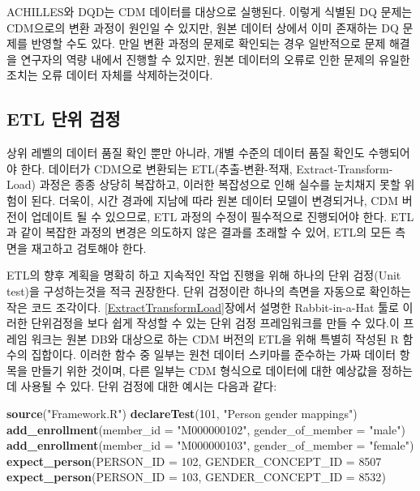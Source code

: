 \documentclass[10.5pt]{book}
\newenvironment{Shaded}{\begin{snugshade}}{\end{snugshade}}
\newcommand{\KeywordTok}[1]{\textcolor[rgb]{0.13,0.29,0.53}{\textbf{#1}}}
\newcommand{\DataTypeTok}[1]{\textcolor[rgb]{0.13,0.29,0.53}{#1}}
\newcommand{\DecValTok}[1]{\textcolor[rgb]{0.00,0.00,0.81}{#1}}
\newcommand{\StringTok}[1]{\textcolor[rgb]{0.31,0.60,0.02}{#1}}
\newcommand{\NormalTok}[1]{#1}
\theoremstyle{definition}
\theoremstyle{definition}
\theoremstyle{definition}
\theoremstyle{remark}
\let\BeginKnitrBlock\begin \let\EndKnitrBlock\end
\begin{document}
\BeginKnitrBlock{rmdimportant}
ACHILLES와 DQD는 CDM 데이터를 대상으로 실행된다. 이렇게 식별된 DQ 문제는
CDM으로의 변환 과정이 원인일 수 있지만, 원본 데이터 상에서 이미 존재하는
DQ 문제를 반영할 수도 있다. 만일 변환 과정의 문제로 확인되는 경우
일반적으로 문제 해결을 연구자의 역량 내에서 진행할 수 있지만, 원본
데이터의 오류로 인한 문제의 유일한 조치는 오류 데이터 자체를
삭제하는것이다.
\EndKnitrBlock{rmdimportant}

\subsection{ETL 단위 검정}\label{etlUnitTests}


상위 레벨의 데이터 품질 확인 뿐만 아니라, 개별 수준의 데이터 품질 확인도
수행되어야 한다. 데이터가 CDM으로 변환되는 ETL(추출-변환-적재,
Extract-Transform-Load) 과정은 종종 상당히 복잡하고, 이러한 복잡성으로
인해 실수를 눈치채지 못할 위험이 된다. 더욱이, 시간 경과에 지남에 따라
원본 데이터 모델이 변경되거나, CDM 버전이 업데이트 될 수 있으므로, ETL
과정의 수정이 필수적으로 진행되어야 한다. ETL과 같이 복잡한 과정의
변경은 의도하지 않은 결과를 초래할 수 있어, ETL의 모든 측면을 재고하고
검토해야 한다.

ETL의 향후 계획을 명확히 하고 지속적인 작업 진행을 위해 하나의 단위
검정(Unit test)을 구성하는것을 적극 권장한다. 단위 검정이란 하나의
측면을 자동으로 확인하는 작은 코드 조각이다.
\ref{ExtractTransformLoad}장에서 설명한 Rabbit-in-a-Hat 툴로 이러한
단위검정을 보다 쉽게 작성할 수 있는 단위 검정 프레임워크를 만들 수
있다.이 프레임 워크는 원본 DB와 대상으로 하는 CDM 버전의 ETL을 위해
특별히 작성된 R 함수의 집합이다. 이러한 함수 중 일부는 원천 데이터
스키마를 준수하는 가짜 데이터 항목을 만들기 위한 것이며, 다른 일부는 CDM
형식으로 데이터에 대한 예상값을 정하는 데 사용될 수 있다. 단위 검정에
대한 예시는 다음과 같다:

\begin{Shaded}
\begin{Highlighting}[]
\KeywordTok{source}\NormalTok{(}\StringTok{"Framework.R"}\NormalTok{)}
\KeywordTok{declareTest}\NormalTok{(}\DecValTok{101}\NormalTok{, }\StringTok{"Person gender mappings"}\NormalTok{)}
\KeywordTok{add_enrollment}\NormalTok{(}\DataTypeTok{member_id =} \StringTok{"M000000102"}\NormalTok{, }\DataTypeTok{gender_of_member =} \StringTok{"male"}\NormalTok{)}
\KeywordTok{add_enrollment}\NormalTok{(}\DataTypeTok{member_id =} \StringTok{"M000000103"}\NormalTok{, }\DataTypeTok{gender_of_member =} \StringTok{"female"}\NormalTok{)}
\KeywordTok{expect_person}\NormalTok{(}\DataTypeTok{PERSON_ID =} \DecValTok{102}\NormalTok{, }\DataTypeTok{GENDER_CONCEPT_ID =} \DecValTok{8507}
\KeywordTok{expect_person}\NormalTok{(}\DataTypeTok{PERSON_ID =} \DecValTok{103}\NormalTok{, }\DataTypeTok{GENDER_CONCEPT_ID =} \DecValTok{8532}\NormalTok{)}
\end{Highlighting}
\end{Shaded}
\end{document}
